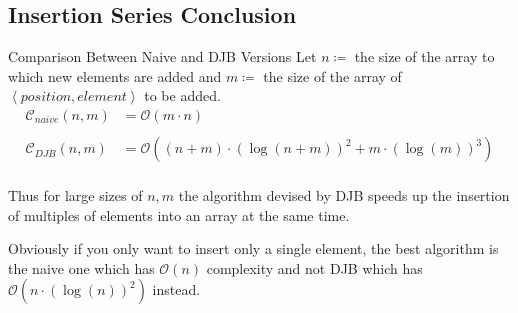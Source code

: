         










        

    \subsection{Insertion Series Conclusion}
        \begin{frame}{Comparison Between Naive and DJB Versions}
            \vspace{-0.1cm}
            Let $n \coloneqq$ the size of the array to which new elements are added and $m \coloneqq$ the size of the array of $\left<position, element\right>$ to be added.
            \begin{align*}
                \mathcal{C}_{naive}{\left(n, m\right)} & = \mathcal{O}{\left(m \cdot n\right)} \\
                \\
                \mathcal{C}_{DJB}{\left(n, m\right)} & = \mathcal{O}{\left(\left(n + m\right) \cdot \left(\log{\left(n + m\right)}\right)^2 + m \cdot \left(\log{\left(m\right)}\right)^3\right)} \\
            \end{align*}
    
            Thus for large sizes of $n, m$ the algorithm devised by DJB speeds up the insertion of multiples of elements into an array at the same time.
    
            Obviously if you only want to insert only a single element, the best algorithm is the naive one which has $\mathcal{O}{\left(n\right)}$ complexity and not DJB which has $\mathcal{O}{\left(n \cdot \left(\log{\left(n\right)}\right)^2\right)}$ instead.
        \end{frame}
    
